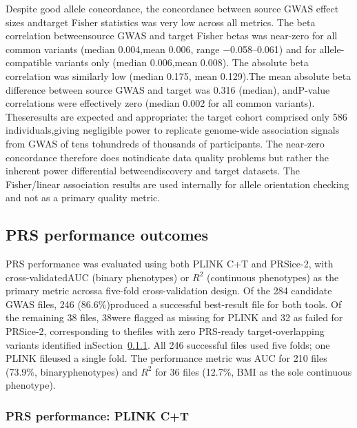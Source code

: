 \documentclass[11pt,a4paper]{article}
\begin{document}
Despite good allele concordance, the concordance between source GWAS effect sizes andtarget Fisher statistics was very low across all metrics. The beta correlation betweensource GWAS and target Fisher betas was near-zero for all common variants (median 0.004,mean 0.006, range $-$0.058--0.061) and for allele-compatible variants only (median 0.006,mean 0.008). The absolute beta correlation was similarly low (median 0.175, mean 0.129).The mean absolute beta difference between source GWAS and target was 0.316 (median), andP-value correlations were effectively zero (median 0.002 for all common variants). Theseresults are expected and appropriate: the target cohort comprised only 586 individuals,giving negligible power to replicate genome-wide association signals from GWAS of tens tohundreds of thousands of participants. The near-zero concordance therefore does notindicate data quality problems but rather the inherent power differential betweendiscovery and target datasets. The Fisher/linear association results are used internally for allele orientation checking and not as a primary quality metric.

\subsection{PRS performance outcomes}

PRS performance was evaluated using both PLINK C+T and PRSice-2, with cross-validatedAUC (binary phenotypes) or $R^{2}$ (continuous phenotypes) as the primary metric acrossa five-fold cross-validation design. Of the 284 candidate GWAS files, 246 (86.6\%)produced a successful best-result file for both tools. Of the remaining 38 files, 38were flagged as missing for PLINK and 32 as failed for PRSice-2, corresponding to thefiles with zero PRS-ready target-overlapping variants identified inSection~\ref{sec}. All 246 successful files used five folds; one PLINK fileused a single fold. The performance metric was AUC for 210 files (73.9\%, binaryphenotypes) and $R^{2}$ for 36 files (12.7\%, BMI as the sole continuous phenotype).

\subsubsection{PRS performance: PLINK C+T}
\label{sec}
\end{document}

